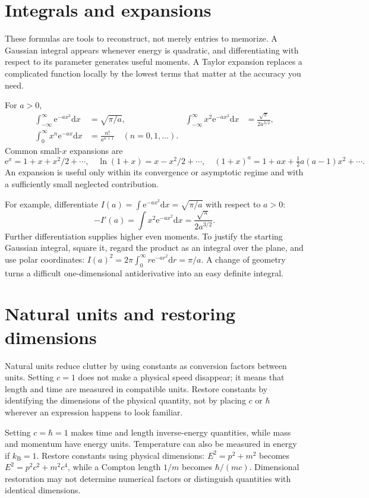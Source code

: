 \documentclass[11pt,oneside]{book}
\newcommand{\dd}{\mathrm{d}}
\newcommand{\ee}{\mathrm{e}}
\newcommand{\kb}{k_{\mathrm B}}
\theoremstyle{reviewstyle}
\begin{document}
\section{Integrals and expansions}
These formulas are tools to reconstruct, not merely entries to memorize. A Gaussian integral appears whenever energy is quadratic, and differentiating with respect to its parameter generates useful moments. A Taylor expansion replaces a complicated function locally by the lowest terms that matter at the accuracy you need.

For $a>0$,
\begin{align}
\int_{-\infty}^{\infty}\ee^{-ax^2}\dd x&=\sqrt{\pi/a},&
\int_{-\infty}^{\infty}x^2\ee^{-ax^2}\dd x&=\frac{\sqrt\pi}{2a^{3/2}},\\
\int_0^\infty x^n\ee^{-ax}\dd x&=\frac{n!}{a^{n+1}}\quad(n=0,1,\ldots).&&
\end{align}
Common small-$x$ expansions are
\begin{equation}\ee^x=1+x+x^2/2+\cdots,\quad \ln(1+x)=x-x^2/2+\cdots,\quad (1+x)^a=1+ax+\tfrac12a(a-1)x^2+\cdots.\end{equation}
An expansion is useful only within its convergence or asymptotic regime and with a sufficiently small neglected contribution.

For example, differentiate $I(a)=\int\ee^{-ax^2}\dd x=\sqrt{\pi/a}$ with respect to $a>0$:
\begin{equation}
-I'(a)=\int x^2\ee^{-ax^2}\dd x=\frac{\sqrt\pi}{2a^{3/2}}.
\end{equation}
Further differentiation supplies higher even moments. To justify the starting Gaussian integral, square it, regard the product as an integral over the plane, and use polar coordinates: $I(a)^2=2\pi\int_0^\infty r\ee^{-ar^2}\dd r=\pi/a$. A change of geometry turns a difficult one-dimensional antiderivative into an easy definite integral.

\section{Natural units and restoring dimensions}
Natural units reduce clutter by using constants as conversion factors between units. Setting $c=1$ does not make a physical speed disappear; it means that length and time are measured in compatible units. Restore constants by identifying the dimensions of the physical quantity, not by placing $c$ or $\hbar$ wherever an expression happens to look familiar.

Setting $c=\hbar=1$ makes time and length inverse-energy quantities, while mass and momentum have energy units. Temperature can also be measured in energy if $\kb=1$. Restore constants using physical dimensions: $E^2=p^2+m^2$ becomes $E^2=p^2c^2+m^2c^4$, while a Compton length $1/m$ becomes $\hbar/(mc)$. Dimensional restoration may not determine numerical factors or distinguish quantities with identical dimensions.
\end{document}
